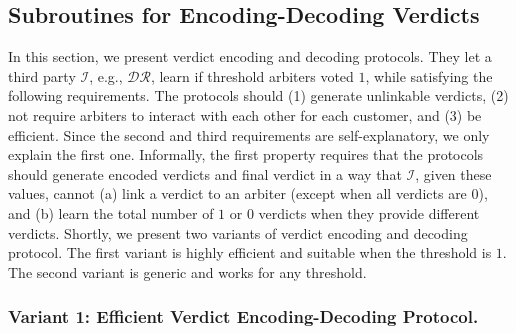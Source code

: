
\subsection{Subroutines for  Encoding-Decoding Verdicts}\label{sec::Encoding-Decoding-Verdicts}


In this section, we present verdict encoding and decoding protocols. They let a third party $\mathcal{I}$, e.g., $\mathcal{DR}$, learn if threshold  arbiters voted $1$, while satisfying the following  requirements.  The protocols should (1) generate unlinkable verdicts, (2)  not require arbiters to interact with each other for each customer, and (3) be  efficient. Since the second and third requirements are self-explanatory,  we only explain the first one.  Informally, the first property requires  that the protocols should generate encoded verdicts and final verdict in a way that $\mathcal{I}$,  given these values, cannot (a)   link a  verdict to an arbiter (except when all verdicts are $0$), and (b) learn the total number of $1$ or $0$ verdicts when they provide different verdicts.  Shortly, we present two variants of verdict encoding and decoding protocol. The first variant is highly efficient and suitable when the threshold is $1$. The second variant is  generic and works for any threshold. 


\vspace{-2mm}
\subsubsection{Variant 1:  Efficient Verdict  Encoding-Decoding Protocol.}



